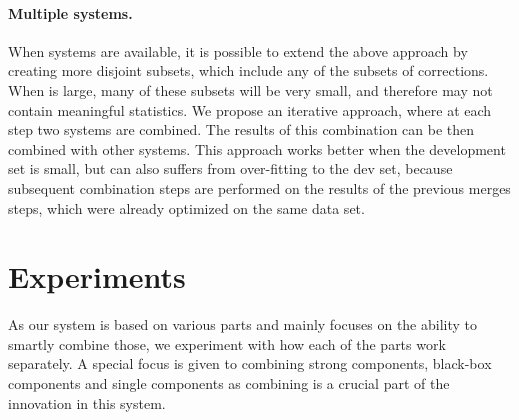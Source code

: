 \documentclass[11pt,a4paper]{article}
\begin{document}
\begin{table*}[htb]
\caption{Combination statistics of the most common error types over two systems - Nematus and Grammarly}  \label{ta:example_selection}

\end{table*}

 \paragraph{Multiple systems.} When  systems are available, it is possible to extend the above approach by creating more disjoint subsets, which include any of the  subsets of corrections. When  is large, many of these subsets will be very small, and therefore may not contain meaningful statistics.  We propose an iterative approach, where at each step two systems are combined.  The results of this combination can be then combined with other systems. This approach works better when the development set is small, but can also suffers from over-fitting to the dev set, because subsequent combination steps are performed on the results of the previous merges steps, which were already optimized on the same data set.   

 

 \section{Experiments} \label{sec:experiments}
As our system is based on various parts and mainly focuses on the ability to smartly combine those, we experiment with how each of the parts work separately. A special focus is given to combining strong components, black-box components and single components as  combining is a crucial part of the innovation in this system.
\end{document}
